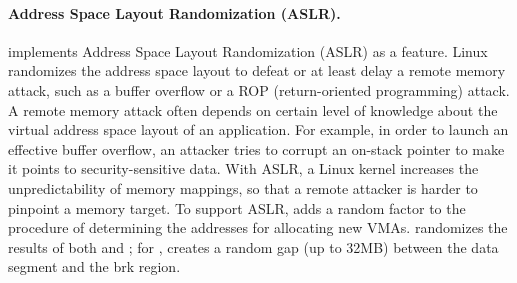 \paragraph{Address Space Layout Randomization (ASLR).}

\thelibos{} implements Address Space Layout Randomization (ASLR) as a \libos{} feature.
Linux randomizes the address space layout to defeat or at least delay a remote memory attack, such as
a buffer overflow or a ROP (return-oriented programming) attack.
A remote memory attack
often depends on certain level of knowledge about the virtual address space layout of an application.
For example, in order to launch an effective buffer overflow,
an attacker tries to corrupt an on-stack pointer to make it points to security-sensitive data.
With ASLR, a Linux kernel increases the unpredictability of memory mappings,
so that a remote attacker is harder
to pinpoint a memory target.
To support ASLR,
\thelibos{} adds a random factor to the procedure of determining the addresses for allocating new VMAs.
\thelibos{} randomizes the results of both  and ;
for , \thelibos{} creates a random gap (up to 32MB) between the data segment and the brk region.






